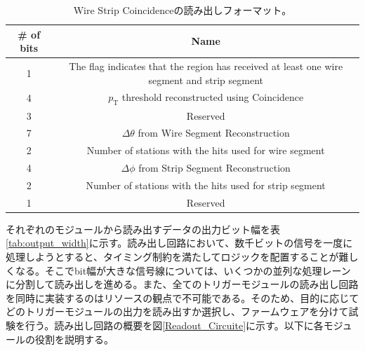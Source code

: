 \begin{table}[]
    \centering
    \caption[Wire Strip Coincidenceの読み出しフォーマット]{Wire Strip Coincidenceの読み出しフォーマット。}
    \label{tab:WS_format}
    \begin{tabular}{|c|c|}
    \hline
    \# of bits & Name                                                                                        \\ \hline\hline
    1          & The flag indicates that the region has received at least one wire segment and strip segment \\ \hline
    4          & $p_{\mathrm{T}}$ threshold reconstructed using Coincidence                                  \\ \hline
    3          & Reserved                                                                                    \\ \hline
    7          & $\Delta\theta$ from Wire Segment Reconstruction                                             \\ \hline
    2          & Number of stations with the hits used for wire segment                                      \\ \hline
    4          & $\Delta\phi$ from Strip Segment Reconstruction                                              \\ \hline
    2          & Number of stations with the hits used for strip segment                                     \\ \hline
    1          & Reserved                                                                                    \\ \hline
    \end{tabular}
\end{table}


それぞれのモジュールから読み出すデータの出力ビット幅を表\ref{tab:output_width}に示す。読み出し回路において、数千ビットの信号を一度に処理しようとすると、タイミング制約を満たしてロジックを配置することが難しくなる。そこでbit幅が大きな信号線については、いくつかの並列な処理レーンに分割して読み出しを進める。また、全てのトリガーモジュールの読み出し回路を同時に実装するのはリソースの観点で不可能である。そのため、目的に応じてどのトリガーモジュールの出力を読み出すか選択し、ファームウェアを分けて試験を行う。読み出し回路の概要を図\ref{Readout_Circuite}に示す。以下に各モジュールの役割を説明する。


